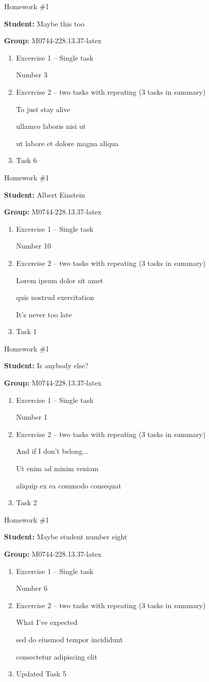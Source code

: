 \documentclass[12pt, fleqn, a4paper]{article}
\newcommand{\preamble}{\lipsum[1]}
\newcommand{\generatepage}[4]{
	\begin{center}
		{\Large #1}

		\textbf{Student:} #2

		\textbf{Group:} #3

	\end{center}

	\vspace{10pt}

	\preamble

	\begin{enumerate}
		#4
	\end{enumerate}

	\pagebreak
}
\begin{document}
	\generatepage{Homework \#1}{Maybe this too}{M0744-228.13.37-latex}{
		\item Excercise 1 -- Single task

			Number 3
		\item Excercise 2 -- two tasks with repeating (3 tasks in summary)

			To just stay alive

			ullamco laboris nisi ut 

			ut labore et dolore magna aliqua 
		\item 

			Task 6
	}

	\generatepage{Homework \#1}{Albert Einstein}{M0744-228.13.37-latex}{
		\item Excercise 1 -- Single task

			Number 10
		\item Excercise 2 -- two tasks with repeating (3 tasks in summary)

			Lorem ipsum dolor sit amet

			quis nostrud exercitation 

			It's never too late
		\item 

			Task 1
	}

	\generatepage{Homework \#1}{Is anybody else?}{M0744-228.13.37-latex}{
		\item Excercise 1 -- Single task

			Number 1
		\item Excercise 2 -- two tasks with repeating (3 tasks in summary)

			And if I don't belong...

			Ut enim ad minim veniam

			aliquip ex ea commodo consequat
		\item 

			Task 2
	}

	\generatepage{Homework \#1}{Maybe student number eight}{M0744-228.13.37-latex}{
		\item Excercise 1 -- Single task

			Number 6
		\item Excercise 2 -- two tasks with repeating (3 tasks in summary)

			What I've expected

			sed do eiusmod tempor incididunt 

			consectetur adipiscing elit
		\item 

			Updated Task 5
	}
\end{document}
